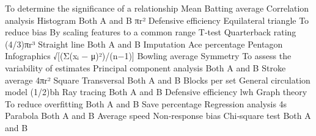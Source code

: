 \answerkey
{} To determine the significance of a relationship
 Mean
 Batting average
 Correlation analysis
 Histogram
 Both A and B
 πr²
 Defensive efficiency
 Equilateral triangle
 To reduce bias
 By scaling features to a common range
 T‑test
 Quarterback rating
 (4/3)πr³
 Straight line
 Both A and B
 Imputation
 Ace percentage
 Pentagon
 Infographics
 √[(Σ(xᵢ − μ)²)/(n−1)]
 Bowling average
 Symmetry
 To assess the variability of estimates
 Principal component analysis
 Both A and B
 Stroke average
 4πr²
 Square
 Transversal
 Both A and B
 Blocks per set
 General circulation model
 (1/2)bh
 Ray tracing
 Both A and B
 Defensive efficiency
 lwh
 Graph theory
 To reduce overfitting
 Both A and B
 Save percentage
 Regression analysis
 4s
 Parabola
 Both A and B
 Average speed
 Non‑response bias
 Chi‑square test
 Both A and B
\endanswerkey